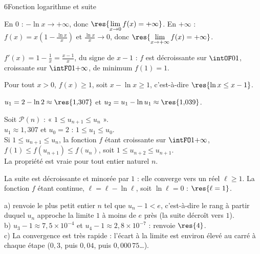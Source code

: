 \begin{corrigeBac}{6}{Fonction logarithme et suite}
\begin{questions}
  \item En $0$ : $-\ln x\to+\infty$, donc $\res{\lim\limits_{x\to0}f(x)=+\infty}$. En $+\infty$ : $f(x)=x\left(1-\frac{\ln x}{x}\right)$ et
    $\frac{\ln x}{x}\to0$, donc $\res{\lim\limits_{x\to+\infty}f(x)=+\infty}$. 
  \item $f'(x)=1-\frac1x=\frac{x-1}{x}$, du signe de $x-1$ : $f$ est décroissante sur $\intOF01$, croissante sur $\intFO1{+\infty}$, de
    minimum $f(1)=1$.
\begin{center}
\begin{tableau}
\end{tableau}
\end{center}
    \pts{1 pt}
  \item Pour tout $x>0$, $f(x)\geq1$, soit $x-\ln x\geq1$, c'est-à-dire $\res{\ln x\leq x-1}$. 
\end{questions}
\begin{questions}[resume]
  \item $u_1=2-\ln2\approx\res{1{,}307}$ et $u_2=u_1-\ln u_1\approx\res{1{,}039}$. 
  \item Soit $\mathcal{P}(n)$ : « $1\leq u_{n+1}\leq u_n$ ».\\
     $u_1\approx1{,}307$ et $u_0=2$ : $1\leq u_1\leq u_0$.\\
     Si $1\leq u_{n+1}\leq u_n$, la fonction $f$ étant croissante sur $\intFO1{+\infty}$,
    $f(1)\leq f(u_{n+1})\leq f(u_n)$, soit $1\leq u_{n+2}\leq u_{n+1}$.\\
     La propriété est vraie pour tout entier naturel $n$. 
  \item La suite est décroissante et minorée par $1$ : elle converge vers un réel $\ell\geq1$. La fonction $f$ étant continue,
    $\ell=\ell-\ln\ell$, soit $\ln\ell=0$ : $\res{\ell=1}$. 
  \item a)  renvoie le plus petit entier $n$ tel que $u_n-1<e$, c'est-à-dire le rang à partir duquel $u_n$ approche la
    limite $1$ à moins de $e$ près (la suite décroît vers $1$).\\
    b) $u_3-1\approx7{,}5\times10^{-4}$ et $u_4-1\approx2{,}8\times10^{-7}$ :  renvoie $\res{4}$.\\
    c) La convergence est très rapide : l'écart à la limite est environ élevé au carré à chaque étape ($0{,}3$, puis $0{,}04$, puis
    $0{,}000\,75$…). \pts{1 pt}
\end{questions}
\end{corrigeBac}

